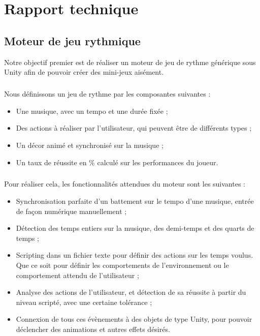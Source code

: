 \chapter{Rapport technique}



\section{Moteur de jeu rythmique}

Notre objectif premier est de réaliser un moteur de jeu de rythme générique sous Unity afin de pouvoir créer des mini-jeux aisément.

\paragraph{}

Nous définissons un jeu de rythme par les composantes suivantes :
\begin{itemize}
\item Une musique, avec un tempo et une durée fixée ;
\item Des actions à réaliser par l'utilisateur, qui peuvent être de différents types ;
\item Un décor animé et synchronisé sur la musique ;
\item Un taux de réussite en \% calculé sur les performances du joueur.
\end{itemize}

\paragraph{}

Pour réaliser cela, les fonctionnalités attendues du moteur sont les suivantes :
\begin{itemize}
\item Synchronisation parfaite d'un battement sur le tempo d'une musique, entrée de façon numérique manuellement ;
\item Détection des temps entiers sur la musique, des demi-temps et des quarts de temps ;
\item Scripting dans un fichier texte pour définir des actions sur les temps voulus. Que ce soit pour définir les comportements de l'environnement ou le comportement attendu de l'utilisateur ;
\item Analyse des actions de l'utilisateur, et détection de sa réussite à partir du niveau scripté, avec une certaine tolérance ;
\item Connexion de tous ces évènements à des objets de type Unity, pour pouvoir déclencher des animations et autres effets désirés.
\end{itemize}


